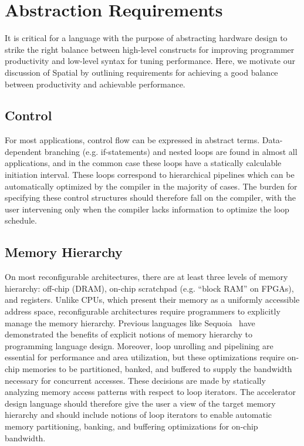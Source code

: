 \section{Abstraction Requirements}
It is critical for a language with the purpose of abstracting hardware design to strike the right
balance between high-level constructs for improving programmer productivity and low-level syntax for tuning performance. Here, we motivate our discussion of Spatial by outlining requirements for achieving a good balance between productivity and achievable performance.

\subsection{Control}
For most applications, control flow can be expressed in abstract terms. Data-dependent branching (e.g. if-statements)
and nested loops are found in almost all applications, and in the common case these loops have a statically calculable
initiation interval. These loops correspond to hierarchical pipelines which can be automatically optimized by the
compiler in the majority of cases. The burden for specifying these control structures should therefore fall on the
compiler, with the user intervening only when the compiler lacks information to optimize the loop schedule.

\subsection{Memory Hierarchy}
On most reconfigurable architectures, there are at least three levels of memory hierarchy: off-chip (DRAM),
on-chip scratchpad (e.g. ``block RAM'' on FPGAs), and registers.
Unlike CPUs, which present their memory as a uniformly accessible address space,
reconfigurable architectures require programmers to explicitly manage the memory hierarchy.
Previous languages like Sequoia~\cite{sequoia} have demonstrated the benefits of explicit notions of memory hierarchy
to programming language design. Moreover, loop unrolling and pipelining are essential for performance and area utilization, but these optimizations
require on-chip memories to be partitioned, banked, and buffered to supply the bandwidth necessary for concurrent accesses.
These decisions are made by statically analyzing memory access patterns with respect to loop iterators.
The accelerator design language should therefore give the user a view of the target memory
hierarchy and should include notions of loop iterators to enable automatic memory partitioning, banking, and buffering optimizations for on-chip bandwidth.

